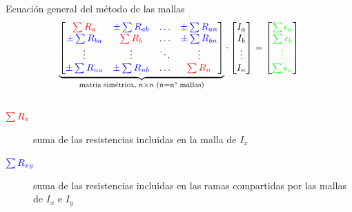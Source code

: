 \documentclass[aspectratio=169, xcolor={usenames,svgnames,dvipsnames}]{beamer}
\begin{document}
\begin{frame}{Ecuación general del método de las mallas}
    \vspace{6mm}
    \begin{equation*}
		\underbrace{\begin{bmatrix}
			{\color{red}\sum R_{a}} &  {\color{blue}\pm\sum R_{ab}} & {\color{blue}{\dots}} & {\color{blue}\pm\sum R_{an}} \\
			{\color{blue}\pm\sum R_{ba}} & {\color{red}\sum R_{b}} & {{\dots}} & {\color{blue}\pm\sum R_{bn}} \\
			{\vdots} & {\vdots} &  {\ddots} & \vdots\\
			{\color{blue}\pm\sum R_{na}} & {\color{blue}\pm\sum R_{nb}} & \dots & {\color{red}\sum R_{n}}
		\end{bmatrix}}_{\textrm{matriz simétrica}, \; n\times n \; (n=\textrm{n° mallas)}} \cdot 
		\begin{bmatrix}
			I_a\\
			I_b\\
			\vdots\\
			I_n
		\end{bmatrix} = %
		\begin{bmatrix}
			{\color{green}\sum\epsilon_a}\\
			{\color{green}\sum\epsilon_b}\\
			{\color{green}\vdots}\\
			{\color{green}\sum\epsilon_n}
		\end{bmatrix}
	\end{equation*}
 
    \vspace{4mm}
    
    \begin{columns}
    \hspace*{-0.8cm}
    \begin{column}{1.07\textwidth} %
        \begin{description}
        \item[{\({\color{red}\sum R_{x}}\)}] suma de las resistencias incluidas en la malla de \(I_x\)

        \vspace{2mm}
        
        \item[{\({\color{blue}\sum R_{xy}}\)}] suma de las resistencias incluidas en las ramas compartidas por las mallas de \(I_x\) e \(I_y\) 
        

\end{description}
\end{column}
\end{columns}
\end{frame}
\end{document}
